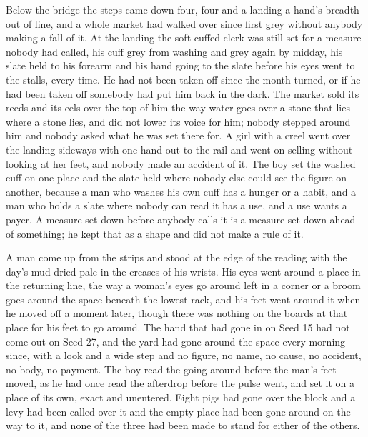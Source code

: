 Below the bridge the steps came down four, four and a landing a hand's breadth out of line, and a whole market had walked over  since first grey without anybody making a fall of it. At the landing the soft-cuffed clerk was still set for a measure nobody had called, his cuff grey from washing and grey again by midday, his slate held to his forearm and his hand going to the slate before his eyes went to the stalls, every time. He had not been taken off since the month turned, or if he had been taken off somebody had put him back in the dark. The market sold its reeds and its eels over the top of him the way water goes over a stone that lies where a stone lies, and did not lower its voice for him; nobody stepped around him and nobody asked what he was set there for. A girl with a creel went over the landing sideways with one hand out to the rail and went on selling without looking at her feet, and nobody made an accident of it. The boy set the washed cuff on one place and the slate held where nobody else could see the figure on another, because a man who washes his own cuff has a hunger or a habit, and a man who holds a slate where nobody can read it has a use, and a use wants a payer. A measure set down before anybody calls it is a measure set down ahead of something; he kept that as a shape and did not make a rule of it.

A man come up from the strips and stood at the edge of the reading with the day's mud dried pale in the creases of his wrists. His eyes went around a place in the returning line, the way a woman's eyes go around  left in a corner or a broom goes around the space beneath the lowest rack, and his feet went around it when he moved off a moment later, though there was nothing on the boards at that place for his feet to go around. The hand that had gone in on Seed 15 had not come out on Seed 27, and the yard had gone around the space every morning since, with a look and a wide step and no figure, no name, no cause, no accident, no body, no payment. The boy read the going-around before the man's feet moved, as he had once read the afterdrop before the pulse went, and set it on a place of its own, exact and unentered. Eight pigs had gone over the block and a levy had been called over it and the empty place had been gone around on the way to it, and none of the three had been made to stand for either of the others.

